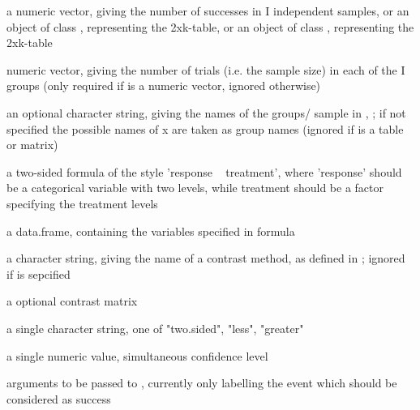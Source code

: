 \begin{Arguments}
\begin{ldescription}
\item[\code{x}] a numeric vector, giving the number of successes in I independent samples,
or an object of class , representing the 2xk-table,
or an object of class , representing the 2xk-table
\item[\code{n}] numeric vector, giving the number of trials (i.e. the sample size) in each of the I groups
(only required if  is a numeric vector, ignored otherwise)  
\item[\code{names}] an optional character string, giving the names of the groups/ sample in , ;
if not specified the possible names of x are taken as group names (ignored if  is a table or matrix)
\item[\code{formula}] a two-sided formula of the style 'response ~ treatment', where 'response' should be a categorical variable with two levels,
while treatment should be a factor specifying the treatment levels
\item[\code{data}] a data.frame, containing the variables specified in formula
\item[\code{type}] a character string, giving the name of a contrast method,
as defined in ; ignored if  is sepcified 
\item[\code{cmat}] a optional contrast matrix 
\item[\code{alternative}] a single character string, one of "two.sided", "less", "greater" 
\item[\code{conf.level}] a single numeric value, simultaneous confidence level 
\item[\code{...}] arguments to be passed to , currently only  labelling the event which should be considered as success
\end{ldescription}
\end{Arguments}
\begin{Details}\relax
\end{Details}

